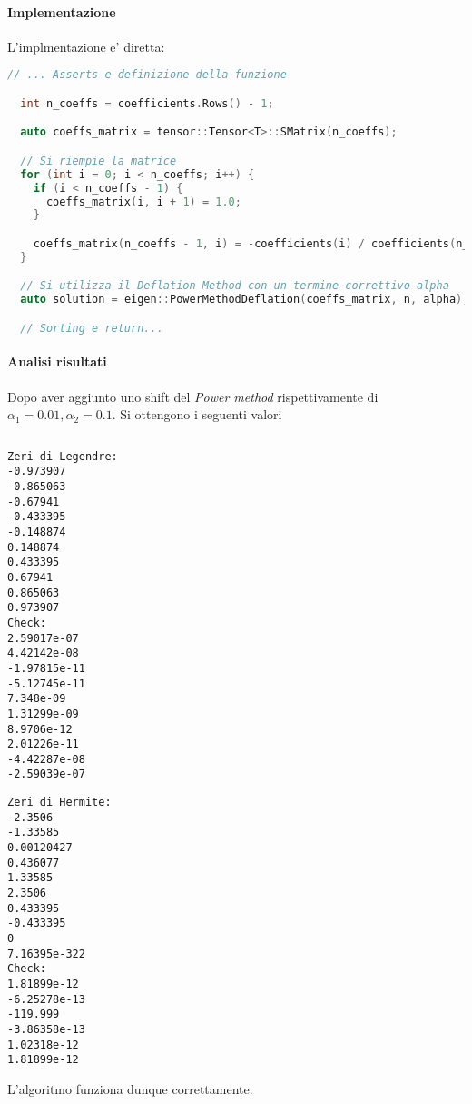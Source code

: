 \paragraph{Implementazione}

L'implmentazione e' diretta: 
\begin{lstlisting}[language=C++]
  // ... Asserts e definizione della funzione

  int n_coeffs = coefficients.Rows() - 1;

  auto coeffs_matrix = tensor::Tensor<T>::SMatrix(n_coeffs);

  // Si riempie la matrice 
  for (int i = 0; i < n_coeffs; i++) {
    if (i < n_coeffs - 1) {
      coeffs_matrix(i, i + 1) = 1.0;
    }

    coeffs_matrix(n_coeffs - 1, i) = -coefficients(i) / coefficients(n_coeffs);
  }

  // Si utilizza il Deflation Method con un termine correttivo alpha
  auto solution = eigen::PowerMethodDeflation(coeffs_matrix, n, alpha);

  // Sorting e return...
\end{lstlisting}

\paragraph{Analisi risultati}

Dopo aver aggiunto uno shift del \textit{Power method} rispettivamente di $\alpha_1=0.01, \alpha_2=0.1$. Si ottengono i seguenti valori

\begin{lstlisting}

\end{lstlisting}

\begin{minipage}{0.45\textwidth}
\lstset{basicstyle=\ttfamily\small, frame=single}
\begin{lstlisting}
Zeri di Legendre:
-0.973907
-0.865063
-0.67941
-0.433395
-0.148874
0.148874
0.433395
0.67941
0.865063
0.973907
Check:
2.59017e-07
4.42142e-08
-1.97815e-11
-5.12745e-11
7.348e-09
1.31299e-09
8.9706e-12
2.01226e-11
-4.42287e-08
-2.59039e-07
\end{lstlisting}
\end{minipage}
\hfill
\begin{minipage}{0.45\textwidth}
\lstset{basicstyle=\ttfamily\small, frame=single}
\begin{lstlisting}
Zeri di Hermite: 
-2.3506
-1.33585
0.00120427
0.436077
1.33585
2.3506
0.433395
-0.433395
0
7.16395e-322
Check:
1.81899e-12
-6.25278e-13
-119.999
-3.86358e-13
1.02318e-12
1.81899e-12
\end{lstlisting}
\end{minipage}

L'algoritmo funziona dunque correttamente.

